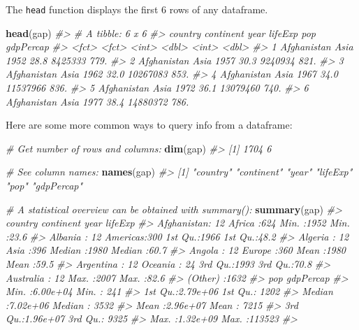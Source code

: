 \documentclass[]{book}
\newenvironment{Shaded}{\begin{snugshade}}{\end{snugshade}}
\newcommand{\KeywordTok}[1]{\textcolor[rgb]{0.13,0.29,0.53}{\textbf{#1}}}
\newcommand{\CommentTok}[1]{\textcolor[rgb]{0.56,0.35,0.01}{\textit{#1}}}
\newcommand{\NormalTok}[1]{#1}
\begin{document}
The \texttt{head} function displays the first 6 rows of any dataframe.

\begin{Shaded}
\begin{Highlighting}[]
\KeywordTok{head}\NormalTok{(gap)}
\CommentTok{#> # A tibble: 6 x 6}
\CommentTok{#>   country     continent  year lifeExp      pop gdpPercap}
\CommentTok{#>   <fct>       <fct>     <int>   <dbl>    <int>     <dbl>}
\CommentTok{#> 1 Afghanistan Asia       1952    28.8  8425333      779.}
\CommentTok{#> 2 Afghanistan Asia       1957    30.3  9240934      821.}
\CommentTok{#> 3 Afghanistan Asia       1962    32.0 10267083      853.}
\CommentTok{#> 4 Afghanistan Asia       1967    34.0 11537966      836.}
\CommentTok{#> 5 Afghanistan Asia       1972    36.1 13079460      740.}
\CommentTok{#> 6 Afghanistan Asia       1977    38.4 14880372      786.}
\end{Highlighting}
\end{Shaded}

Here are some more common ways to query info from a dataframe:

\begin{Shaded}
\begin{Highlighting}[]
\CommentTok{# Get number of rows and columns:}
\KeywordTok{dim}\NormalTok{(gap)}
\CommentTok{#> [1] 1704    6}

\CommentTok{# See column names:}
\KeywordTok{names}\NormalTok{(gap)}
\CommentTok{#> [1] "country"   "continent" "year"      "lifeExp"   "pop"       "gdpPercap"}

\CommentTok{# A statistical overview can be obtained with summary():}
\KeywordTok{summary}\NormalTok{(gap)}
\CommentTok{#>         country        continent        year         lifeExp    }
\CommentTok{#>  Afghanistan:  12   Africa  :624   Min.   :1952   Min.   :23.6  }
\CommentTok{#>  Albania    :  12   Americas:300   1st Qu.:1966   1st Qu.:48.2  }
\CommentTok{#>  Algeria    :  12   Asia    :396   Median :1980   Median :60.7  }
\CommentTok{#>  Angola     :  12   Europe  :360   Mean   :1980   Mean   :59.5  }
\CommentTok{#>  Argentina  :  12   Oceania : 24   3rd Qu.:1993   3rd Qu.:70.8  }
\CommentTok{#>  Australia  :  12                  Max.   :2007   Max.   :82.6  }
\CommentTok{#>  (Other)    :1632                                               }
\CommentTok{#>       pop             gdpPercap     }
\CommentTok{#>  Min.   :6.00e+04   Min.   :   241  }
\CommentTok{#>  1st Qu.:2.79e+06   1st Qu.:  1202  }
\CommentTok{#>  Median :7.02e+06   Median :  3532  }
\CommentTok{#>  Mean   :2.96e+07   Mean   :  7215  }
\CommentTok{#>  3rd Qu.:1.96e+07   3rd Qu.:  9325  }
\CommentTok{#>  Max.   :1.32e+09   Max.   :113523  }
\CommentTok{#> }
\end{Highlighting}
\end{Shaded}
\end{document}
